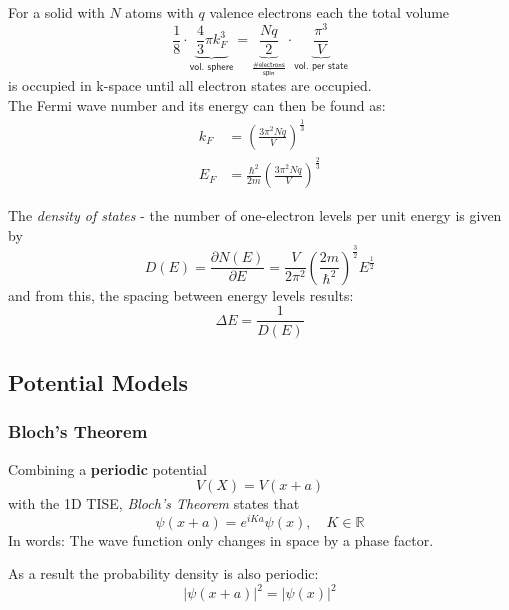 \newpar{}
For a solid with $N$ atoms with $q$ valence electrons each the total volume
\noindent\begin{equation*}
    \frac{1}{8}\cdot\underbrace{\frac{4}{3}\pi k_F^3}_{\textsf{vol. sphere}} = \underbrace{\frac{Nq}{2}}_{\frac{\textsf{\# electrons}}{\mathsf{spin}}}\cdot \underbrace{\frac{\pi^3}{V}}_{\textsf{vol. per state}}
\end{equation*}
is occupied in k-space until all electron states are occupied.\\
The Fermi wave number and its energy can then be found as:
\noindent\begin{align*}
    k_F & = {\left(\frac{3\pi^2 N q}{V}\right)}^{\frac{1}{3}}                   \\
    E_F & = \frac{\hbar^2}{2m}{\left(\frac{3\pi^2 N q}{V}\right)}^{\frac{2}{3}}
\end{align*}

The \textit{density of states} - the number of one-electron levels per unit energy is given by
\noindent\begin{equation*}
    D(E)=\frac{\partial N(E)}{\partial E} = \frac{V}{2\pi^2}{\left(\frac{2m}{\hbar^2}\right)}^{\frac{3}{2}} E^{\frac{1}{2}}
\end{equation*}
and from this, the spacing between energy levels results:
\noindent\begin{equation*}
    \Delta E = \frac{1}{D(E)}
\end{equation*}

\subsection{Potential Models}
\subsubsection{Bloch's Theorem}
Combining a \textbf{periodic} potential
\noindent\begin{equation*}
    V(X) = V(x+a)
\end{equation*}
with the 1D TISE, \textit{Bloch's Theorem} states that
\noindent\begin{equation*}
    \psi(x+a) = e^{iKa} \psi(x), \quad K\in \mathbb{R}
\end{equation*}
In words: The wave function only changes in space by a phase factor.

\newpar{}
As a result the probability density is also periodic:
\noindent\begin{equation*}
    {|\psi(x+a)|}^2={|\psi(x)|}^2
\end{equation*}

